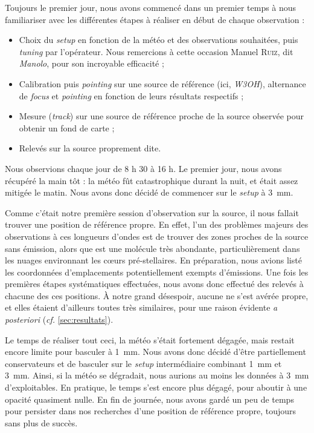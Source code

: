 \documentclass[a4paper,10pt,french]{article}
\newcommand{\setup}{\textit{setup}}
\newcommand{\troismm}{\SI{3}{\milli\meter}}
\newcommand{\unmm}{\SI{1}{\milli\meter}}
\begin{document}
Toujours le premier jour, nous avons commencé dans un premier temps à nous
familiariser avec les différentes étapes à réaliser en début de chaque
observation :
\begin{itemize}
    \item Choix du \setup{} en fonction de la météo et des observations
          souhaitées, puis \textit{tuning} par l’opérateur. Nous remercions à
          cette occasion Manuel \textsc{Ruiz}, dit \textit{Manolo}, pour son incroyable
          efficacité ;
    \item Calibration puis \textit{pointing} sur une source de référence (ici,
          \textit{W3OH}), alternance de \textit{focus} et \textit{pointing} en
          fonction de leurs résultats respectifs ;
    \item Mesure (\textit{track}) sur une source de référence proche de la
          source observée pour obtenir un fond de carte ;
    \item Relevés sur la source proprement dite.
\end{itemize}

Nous observions chaque jour de 8 h 30 à 16 h. Le premier jour, nous avons
récupéré la main tôt : la météo fût catastrophique durant la nuit, et était
assez mitigée le matin. Nous avons donc décidé de commencer sur le \setup{} à
\troismm.

Comme c’était notre première session d’observation sur la source, il nous
fallait trouver une position de référence propre. En effet, l’un des problèmes
majeurs des observations à ces longueurs d’ondes est de trouver des zones
proches de la source sans émission, alors que  est une molécule
très abondante, particulièrement dans les nuages environnant les cœurs
pré-stellaires. En préparation, nous avions listé les coordonnées
d’emplacements potentiellement exempts d’émissions. Une fois les premières
étapes systématiques effectuées, nous avons donc effectué des relevés à chacune
des ces positions. À notre grand désespoir, aucune ne s’est avérée propre, et
elles étaient d’ailleurs toutes très similaires, pour une raison évidente
\textit{a posteriori} (\textit{cf.} \cref{sec:resultats}).

Le temps de réaliser tout ceci, la météo s’était fortement dégagée, mais
restait encore limite pour basculer à \unmm. Nous avons donc décidé d’être
partiellement conservateurs et de basculer sur le \setup{} intermédiaire
combinant \unmm{} et \troismm. Ainsi, si la météo se dégradait, nous aurions au
moins les données à \troismm{} d’exploitables. En pratique, le temps s’est
encore plus dégagé, pour aboutir à une opacité quasiment nulle. En fin de
journée, nous avons gardé un peu de temps pour persister dans nos recherches
d’une position de référence propre, toujours sans plus de succès.
\end{document}
